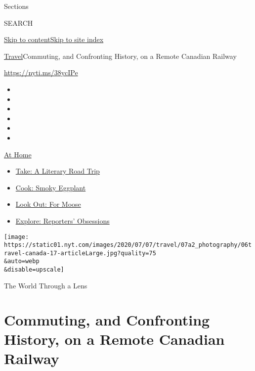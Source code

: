 Sections

SEARCH

\protect\hyperlink{site-content}{Skip to
content}\protect\hyperlink{site-index}{Skip to site index}

\href{/section/travel}{Travel}\textbar{}Commuting, and Confronting
History, on a Remote Canadian Railway

\url{https://nyti.ms/38ycIPe}

\begin{itemize}
\item
\item
\item
\item
\item
\item
\end{itemize}

\href{https://www.nytimes.com/spotlight/at-home?action=click\&pgtype=Article\&state=default\&region=TOP_BANNER\&context=at_home_menu}{At
Home}

\begin{itemize}
\tightlist
\item
  \href{https://www.nytimes.com/2020/07/28/books/time-for-a-literary-road-trip.html?action=click\&pgtype=Article\&state=default\&region=TOP_BANNER\&context=at_home_menu}{Take:
  A Literary Road Trip}
\item
  \href{https://www.nytimes.com/2020/07/29/magazine/bored-with-your-home-cooking-some-smoky-eggplant-will-fix-that.html?action=click\&pgtype=Article\&state=default\&region=TOP_BANNER\&context=at_home_menu}{Cook:
  Smoky Eggplant}
\item
  \href{https://www.nytimes.com/2020/07/27/travel/moose-michigan-isle-royale.html?action=click\&pgtype=Article\&state=default\&region=TOP_BANNER\&context=at_home_menu}{Look
  Out: For Moose}
\item
  \href{https://www.nytimes.com/interactive/2020/at-home/even-more-reporters-editors-diaries-lists-recommendations.html?action=click\&pgtype=Article\&state=default\&region=TOP_BANNER\&context=at_home_menu}{Explore:
  Reporters' Obsessions}
\end{itemize}

\texttt{[image: https://static01.nyt.com/images/2020/07/07/travel/07a2\_photography/06travel-canada-17-articleLarge.jpg?quality=75\\\&auto=webp\\\&disable=upscale]}

The World Through a Lens

\hypertarget{commuting-and-confronting-history-on-a-remote-canadian-railway}{%
\section{Commuting, and Confronting History, on a Remote Canadian
Railway}\label{commuting-and-confronting-history-on-a-remote-canadian-railway}}

